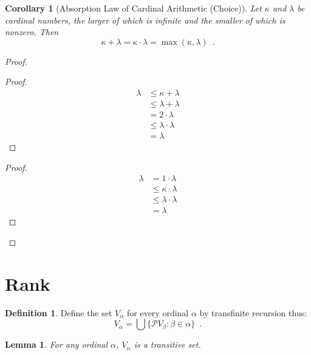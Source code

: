 \documentclass{report}
\let\qed\relax
\newtheorem{lemma}[axiom]{Lemma}
\newtheorem{corollary}{Corollary}[axiom]
\theoremstyle{definition}
\newtheorem{definition}[axiom]{Definition}
\begin{document}
    \begin{corollary}[Absorption Law of Cardinal Arithmetic (Choice)]
        Let $\kappa$ and $\lambda$ be cardinal numbers, the larger of which is infinite and the smaller of
        which is nonzero. Then
        \[ \kappa + \lambda = \kappa \cdot \lambda = \max(\kappa, \lambda) \enspace . \]
    \end{corollary}

    \begin{proof}
        \pf
        \begin{proof}
            \pf
            \begin{align*}
                \lambda & \leq \kappa + \lambda \\
                & \leq \lambda + \lambda \\
                & = 2 \cdot \lambda \\
                & \leq \lambda \cdot \lambda \\
                & = \lambda
            \end{align*}
        \end{proof}
        \begin{proof}
            \pf
            \begin{align*}
                \lambda & = 1 \cdot \lambda \\
                & \leq \kappa \cdot \lambda \\
                & \leq \lambda \cdot \lambda \\
                & = \lambda
            \end{align*}
        \end{proof}
        \qed
    \end{proof}

    \section{Rank}

    \begin{definition}
        Define the set $V_\alpha$ for every ordinal $\alpha$ by transfinite recursion thus:
        \[ V_\alpha = \bigcup \{ \mathcal{P} V_\beta : \beta \in \alpha \} \enspace . \]
    \end{definition}

    \begin{lemma}
        For any ordinal $\alpha$, $V_\alpha$ is a transitive set.
    \end{lemma}
\end{document}
